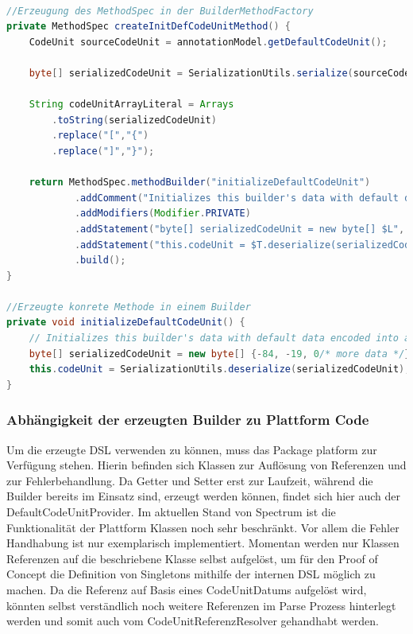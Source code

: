 \documentclass[12pt,oneside,a4paper,parskip]{scrbook}
\begin{document}
\begin{lstlisting}[label=lst:defcu,
language=java,
firstnumber=1,
caption=Quelltext zur Erzeugung des MethodSpecs für die Builder-Methode initializeDefaultCodeUnit und die daraus resultierende konrekte Methode in einem Builder.]

//Erzeugung des MethodSpec in der BuilderMethodFactory
private MethodSpec createInitDefCodeUnitMethod() {
	CodeUnit sourceCodeUnit = annotationModel.getDefaultCodeUnit();

	byte[] serializedCodeUnit = SerializationUtils.serialize(sourceCodeUnit);

	String codeUnitArrayLiteral = Arrays
		.toString(serializedCodeUnit)
		.replace("[","{")
		.replace("]","}");

	return MethodSpec.methodBuilder("initializeDefaultCodeUnit")
			.addComment("Initializes this builder's data with default data encoded into a byte[]")
			.addModifiers(Modifier.PRIVATE)
			.addStatement("byte[] serializedCodeUnit = new byte[] $L", codeUnitArrayLiteral)
			.addStatement("this.codeUnit = $T.deserialize(serializedCodeUnit)", SerializationUtils.class)
			.build();
}

//Erzeugte konrete Methode in einem Builder
private void initializeDefaultCodeUnit() {
	// Initializes this builder's data with default data encoded into a byte[]
	byte[] serializedCodeUnit = new byte[] {-84, -19, 0/* more data */};
	this.codeUnit = SerializationUtils.deserialize(serializedCodeUnit);
}
\end{lstlisting}

\subsubsection{Abhängigkeit der erzeugten Builder zu Plattform Code}\label{sec:plattform}

Um die erzeugte DSL verwenden zu können, muss das Package platform zur Verfügung stehen. Hierin befinden sich Klassen zur Auflösung von Referenzen und zur Fehlerbehandlung. Da Getter und Setter erst zur Laufzeit, während die Builder bereits im Einsatz sind, erzeugt werden können, findet sich hier auch der DefaultCodeUnitProvider. Im aktuellen Stand von Spectrum ist die Funktionalität der Plattform Klassen noch sehr beschränkt. Vor allem die Fehler Handhabung ist nur exemplarisch implementiert. Momentan werden nur Klassen Referenzen auf die beschriebene Klasse selbst aufgelöst, um für den Proof of Concept die Definition von Singletons mithilfe der internen DSL möglich zu machen. Da die Referenz auf Basis eines CodeUnitDatums aufgelöst wird, könnten selbst verständlich noch weitere Referenzen im Parse Prozess hinterlegt werden und somit auch vom CodeUnitReferenzResolver gehandhabt werden.
\end{document}
